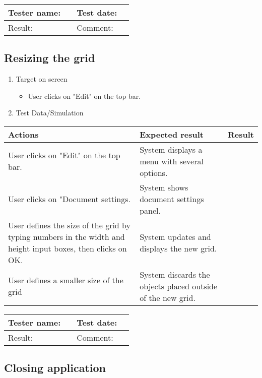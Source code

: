 \begin{tabularx}{\textwidth}{|p{3cm}X|p{3cm}X|}\hline
	Tester name: &  & Test date: & \\\hline
	Result: &  \pass & Comment: & \\\hline
\end{tabularx}

\newpage
\subsection{Resizing the grid}

\begin{enumerate}
	
	\item Target on screen
	\begin{itemize}
		\item User clicks on "Edit" on the top bar.
	\end{itemize}
	\item Test Data/Simulation
\end{enumerate}
	\begin{tabularx}{\textwidth}{|X|X|p{2.5cm}|}\hline
		Actions & Expected result & Result \\\hline

		User clicks on "Edit" on the top bar. & System displays a menu with several options.& \pass \\\hline
		User clicks on "Document settings. & System shows document settings panel. & \pass \\\hline
		User defines the size of the grid by typing numbers in the width and height input boxes, then clicks on OK.& System updates and displays the new grid. & \pass \\\hline
		User defines a smaller size of the grid & System discards the objects placed outside of the new grid. & \pass \\\hline
	\end{tabularx}
	
\begin{tabularx}{\textwidth}{|p{3cm}X|p{3cm}X|}\hline
	Tester name: &  & Test date: & \\\hline
	Result: &  \pass & Comment: & \\\hline
\end{tabularx}

\newpage
\subsection{Closing application}

